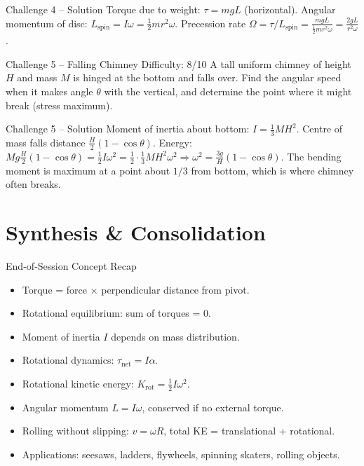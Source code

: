\documentclass[11pt]{beamer}
\begin{document}
\begin{frame}{Challenge 4 – Solution}
Torque due to weight: $\tau = mgL$ (horizontal). Angular momentum of disc: $L_{\text{spin}} = I \omega = \frac12 m r^2 \omega$.
Precession rate $\Omega = \tau / L_{\text{spin}} = \frac{mgL}{\frac12 m r^2 \omega} = \frac{2gL}{r^2 \omega}$.
\end{frame}

\begin{frame}[shrink=15]{Challenge 5 – Falling Chimney \hfill Difficulty: 8/10}
A tall uniform chimney of height $H$ and mass $M$ is hinged at the bottom and falls over. Find the angular speed when it makes angle $\theta$ with the vertical, and determine the point where it might break (stress maximum).
\end{frame}

\begin{frame}[shrink=15]{Challenge 5 – Solution}
Moment of inertia about bottom: $I = \frac13 M H^2$. Centre of mass falls distance $\frac{H}{2}(1-\cos\theta)$. Energy: $Mg\frac{H}{2}(1-\cos\theta) = \frac12 I \omega^2 = \frac12 \cdot \frac13 M H^2 \omega^2 \Rightarrow \omega^2 = \frac{3g}{H}(1-\cos\theta)$.
The bending moment is maximum at a point about $1/3$ from bottom, which is where chimney often breaks.
\end{frame}

\section{Synthesis \& Consolidation}

\begin{frame}{End‑of‑Session Concept Recap}
\begin{itemize}
    \item Torque = force × perpendicular distance from pivot.
    \item Rotational equilibrium: sum of torques = 0.
    \item Moment of inertia $I$ depends on mass distribution.
    \item Rotational dynamics: $\tau_{\text{net}} = I\alpha$.
    \item Rotational kinetic energy: $K_{\text{rot}} = \frac12 I\omega^2$.
    \item Angular momentum $L = I\omega$, conserved if no external torque.
    \item Rolling without slipping: $v = \omega R$, total KE = translational + rotational.
    \item Applications: seesaws, ladders, flywheels, spinning skaters, rolling objects.
\end{itemize}
\end{frame}
\end{document}
